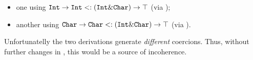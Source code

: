 \begin{itemize}

\item one using $\texttt{Int} \to \texttt{Int} <: (\texttt{Int} \& \texttt{Char}) \to \top$ 
(via );

\item another using $\texttt{Char} \to \texttt{Char} <: (\texttt{Int} \& \texttt{Char}) \to \top$
(via ).

\end{itemize}

\noindent Unfortunatelly the two derivations generate \emph{different}
coercions.  Thus, without further changes in \name, this would be a
source of incoherence.



